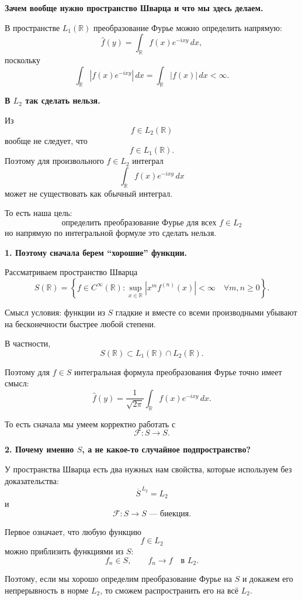 \begin{idea}
	\textbf{Зачем вообще нужно пространство Шварца и что мы здесь делаем.}
	
	В пространстве \(L_1(\mathbb R)\) преобразование Фурье можно определить напрямую:
	\[
	\widehat f(y)
	=
	\int_{\mathbb R}f(x)e^{-ixy}\,dx,
	\]
	поскольку
	\[
	\int_{\mathbb R}|f(x)e^{-ixy}|\,dx
	=
	\int_{\mathbb R}|f(x)|\,dx
	<\infty.
	\]
	
	\textbf{В \(L_2\) так сделать нельзя.}
	
	Из
	\[
	f\in L_2(\mathbb R)
	\]
	вообще не следует, что
	\[
	f\in L_1(\mathbb R).
	\]
	Поэтому для произвольного \(f\in L_2\) интеграл
	\[
	\int_{\mathbb R}f(x)e^{-ixy}\,dx
	\]
	может не существовать как обычный интеграл.
	
	То есть наша цель:
	\[
	\boxed{\text{определить преобразование Фурье для всех }f\in L_2}
	\]
	но напрямую по интегральной формуле это сделать нельзя.
	
	\medskip
	
	\textbf{1. Поэтому сначала берем ``хорошие'' функции.}
	
	Рассматриваем пространство Шварца
	\[
	S(\mathbb R)
	=
	\left\{
	f\in C^\infty(\mathbb R):
	\sup_{x\in\mathbb R}|x^m f^{(n)}(x)|<\infty
	\quad
	\forall m,n\geq0
	\right\}.
	\]
	
	Смысл условия: функции из \(S\) гладкие и вместе со всеми производными
	убывают на бесконечности быстрее любой степени.
	
	В частности,
	\[
	S(\mathbb R)\subset L_1(\mathbb R)\cap L_2(\mathbb R).
	\]
	
	Поэтому для \(f\in S\) интегральная формула преобразования Фурье
	точно имеет смысл:
	\[
	\widehat f(y)
	=
	\frac{1}{\sqrt{2\pi}}
	\int_{\mathbb R}f(x)e^{-ixy}\,dx.
	\]
	
	То есть сначала мы умеем корректно работать с
	\[
	\mathcal F:S\to S.
	\]
	
	\medskip
	
	\textbf{2. Почему именно \(S\), а не какое-то случайное подпространство?}
	
	У пространства Шварца есть два нужных нам свойства,
	которые используем без доказательства:
	\[
	\boxed{\overline{S}^{\,L_2}=L_2}
	\]
	и
	\[
	\boxed{\mathcal F:S\to S\text{ --- биекция}.}
	\]
	
	Первое означает, что любую функцию
	\[
	f\in L_2
	\]
	можно приблизить функциями из \(S\):
	\[
	f_n\in S,
	\qquad
	f_n\to f
	\quad\text{в }L_2.
	\]
	
	Поэтому, если мы хорошо определим преобразование Фурье на \(S\)
	и докажем его непрерывность в норме \(L_2\),
	то сможем распространить его на всё \(L_2\).
	

\end{idea}
